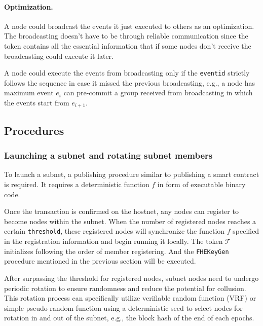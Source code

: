 \documentclass[11pt]{article}
\begin{document}
\paragraph{Optimization.} A node could broadcast the events it just executed to others as an optimization.
The broadcasting doesn{'}t have to be through reliable communication since the token contains all the essential information that if some nodes don{'}t receive the broadcasting could execute it later.

A node could execute the events from broadcasting only if the \texttt{eventid} strictly follows the sequence in case it missed the previous broadcasting, e.g., a node has maximum event $e_{i}$ can pre-commit a group received from broadcasting in which the events start from $e_{i+1}$.


\subsection{Procedures}
\subsubsection{Launching a subnet and rotating subnet members}
To launch a subnet, a publishing procedure similar to publishing a smart contract is required.
It requires a deterministic function $f$ in form of executable binary code.

Once the transaction is confirmed on the hostnet, any nodes can register to become nodes within the subnet.
When the number of registered nodes reaches a certain \texttt{threshold}, these registered nodes will synchronize the function $f$ specified in the registration information and begin running it locally.
The token $\mathcal{T}$ initializes following the order of member registering.
And the \texttt{FHEKeyGen} procedure mentioned in the previous section will be executed.

After surpassing the threshold for registered nodes, subnet nodes need to undergo periodic rotation to ensure randomness and reduce the potential for collusion.
This rotation process can specifically utilize verifiable random function (VRF) or simple pseudo random function using a deterministic seed to select nodes for rotation in and out of the subnet, e.g., the block hash of the end of each epochs.

\end{document}

